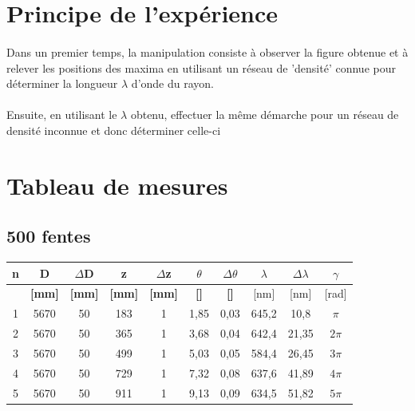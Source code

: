 \documentclass[11pt,a4paper]{report}
\begin{document}
	\section{Principe de l'expérience}
\paragraph{}
Dans un premier temps, la manipulation consiste à observer la figure obtenue et à relever les positions des maxima en utilisant un réseau de 'densité' connue pour déterminer la longueur $\lambda$ d'onde du rayon.

\paragraph{}
Ensuite, en utilisant le $\lambda$ obtenu, effectuer la même démarche pour un réseau de densité inconnue et donc déterminer celle-ci

	\section{Tableau de mesures}
	\subsection{500 fentes}
	\begin{center}	
	\begin{tabular}{|c|c|c|c|c|c|c|c|c|c|}
		\hline
		\bf n & \bf D & \bf $\Delta$D & \bf z & \bf $\Delta$z & \bf $\theta$ & \bf $\Delta \theta$ & $\lambda$& $\Delta \lambda$&\bf $\gamma$ \\
		\hline
		 & \bf [mm] & \bf [mm] & \bf [mm] & \bf [mm] & \bf [\degre]  & \bf [\degre]  &  [nm] & [nm] & [rad]\\
		\hline
		1 & 5670 & 50 & 183 &   1&1,85&0,03&645,2&10,8 &$\pi$\\
		2 & 5670 & 50 & 365 &  1&3,68&0,04&642,4&21,35&$2\pi$\\
		3 & 5670 & 50 & 499 &  1&5,03&0,05&584,4&26,45&$3\pi$\\
		4 & 5670 & 50 & 729 &  1&7,32&0,08&637,6&41,89&$4\pi$\\
		5 & 5670 & 50 & 911 &  1&9,13&0,09&634,5&51,82&$5\pi$\\
		\hline
	\end{tabular}
	\end{center}
\end{document}
